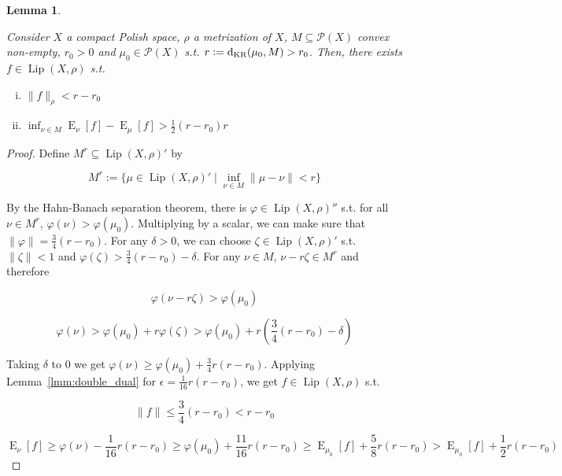 \documentclass[11pt]{article}
\theoremstyle{definition}
\theoremstyle{plain}
\newtheorem{lemma}{Lemma}%
\newcommand{\N}[1]{\lVert #1 \rVert}
\DeclareMathOperator{\E}{E}
\newcommand{\PM}{\mathcal{P}}
\newcommand{\Lp}{{\operatorname{Lip}}}
\newcommand{\DKR}{\operatorname{d}_{\textnormal{KR}}}
\begin{document}
\begin{samepage}
\begin{lemma}
\label{lmm:separation}

Consider $X$ a compact Polish space, $\rho$ a metrization of $X$, $M \subseteq \PM(X)$ convex non-empty, $r_0 > 0$ and $\mu_0 \in \PM(X)$ s.t. $r:=\DKR(\mu_0,M) > r_0$. Then, there exists $f \in \Lp(X,\rho)$ s.t.

\begin{enumerate}[i.]

\item $\N{f}_\rho < r - r_0$
\item $\inf_{\nu \in M} \E_\nu[f] - \E_\mu[f] > \frac{1}{2}(r-r_0)r$

\end{enumerate}

\end{lemma}
\end{samepage}

\begin{proof}

Define $M^r \subseteq \Lp(X,\rho)'$ by

$$M^r:=\{\mu \in \Lp(X,\rho)' \mid \inf_{\nu \in M} \N{\mu - \nu} < r\}$$

By the Hahn-Banach separation theorem, there is $\varphi \in \Lp(X,\rho)''$ s.t. for all $\nu \in M^r$, $\varphi(\nu) > \varphi(\mu_0)$. Multiplying by a scalar, we can make sure that $\N{\varphi} = \frac{3}{4}(r - r_0)$. For any $\delta > 0$, we can choose $\zeta \in \Lp(X,\rho)'$ s.t. $\N{\zeta} < 1$ and $\varphi(\zeta) > \frac{3}{4}(r-r_0) - \delta$.  For any $\nu \in M$, $\nu - r \zeta \in M^r$ and therefore

$$\varphi(\nu - r \zeta) > \varphi(\mu_0)$$

$$\varphi(\nu) > \varphi(\mu_0) + r \varphi(\zeta) > \varphi(\mu_0) + r (\frac{3}{4}(r-r_0) - \delta)$$

Taking $\delta$ to 0 we get $\varphi(\nu) \geq \varphi(\mu_0) + \frac{3}{4} r (r - r_0)$. Applying Lemma~\ref{lmm:double_dual} for $\epsilon = \frac{1}{16} r (r - r_0)$, we get $f \in \Lp(X,\rho)$ s.t.

$$\N{f} \leq \frac{3}{4} (r - r_0) < r - r_0$$ 

$$\E_\nu[f] \geq \varphi(\nu) - \frac{1}{16} r (r - r_0) \geq \varphi(\mu_0) + \frac{11}{16} r (r - r_0) \geq \E_{\mu_0}[f] +  \frac{5}{8} r (r - r_0) > \E_{\mu_0}[f] +  \frac{1}{2} r (r - r_0)$$
\end{proof}
\end{document}
